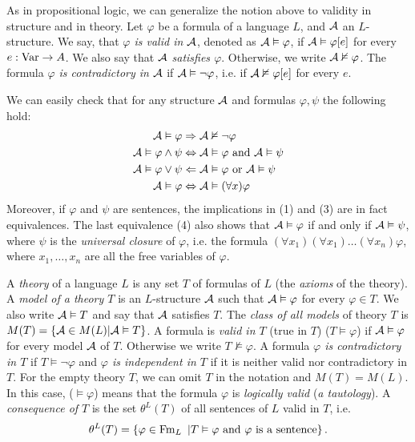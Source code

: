 As in propositional logic, we can generalize the notion above to validity in structure and in theory. Let $\varphi$ be a formula of a language $L$, and $\mathcal{A}$ an $L$-structure. We say, that \emph{$\varphi$ is valid in $\mathcal{A}$}, denoted as $\mathcal{A} \vDash \varphi$, if $\mathcal{A} \vDash \varphi[e]$ for every $e: \operatorname{Var} \to A$. We also say that \emph{$\mathcal{A}$ satisfies $\varphi$}. Otherwise, we write $\mathcal{A} \nvDash \varphi$. The formula \emph{$\varphi$ is contradictory in $\mathcal{A}$} if $\mathcal{A} \vDash \neg \varphi$, i.e. if $\mathcal{A} \nvDash \varphi[e]$ for every $e$.

We can easily check that for any structure $\mathcal{A}$ and formulas $\varphi, \psi$ the following hold:
\begin{align}
	\mathcal{A} \vDash \varphi & \Rightarrow \mathcal{A} \nvDash \neg \varphi \\
	\mathcal{A} \vDash \varphi \land \psi & \Leftrightarrow \mathcal{A} \vDash \varphi \text{ and } \mathcal{A} \vDash \psi\\
	\mathcal{A} \vDash \varphi \lor \psi & \Leftarrow \mathcal{A} \vDash \varphi \text{ or } \mathcal{A} \vDash \psi\\
	\mathcal{A} \vDash \varphi & \Leftrightarrow \mathcal{A} \vDash (\forall x)\varphi
\end{align}
Moreover, if $\varphi$ and $\psi$ are sentences, the implications in (1) and (3) are in fact equivalences. The last equivalence (4) also shows that $\mathcal{A} \vDash \varphi$ if and only if $\mathcal{A} \vDash \psi$, where $\psi$ is the \emph{universal closure} of $\varphi$, i.e. the formula $(\forall x_1)(\forall x_1) \dots (\forall x_n)\varphi$, where $x_1, \dots, x_n$ are all the free variables of $\varphi$.

A \emph{theory} of a language $L$ is any set $T$ of formulas of $L$ (the \emph{axioms} of the theory). A \emph{model of a theory $T$} is an $L$-structure $\mathcal{A}$ such that $\mathcal{A} \vDash \varphi$ for every $\varphi \in T$. We also write $\mathcal{A} \vDash T$ and say that $\mathcal{A}$ satisfies $T$. The \emph{class of all models} of theory $T$ is $M(T) = \{\mathcal{A} \in M(L) | \mathcal{A} \vDash T\}$. A formula is \emph{valid in $T$} (true in $T$) ($T\vDash \varphi$) if $\mathcal{A} \vDash \varphi$ for every model $\mathcal{A}$ of $T$. Otherwise we write $T \nvDash \varphi$. A formula \emph{$\varphi$ is contradictory in $T$} if $T \vDash \neg \varphi$ and \emph{$\varphi$ is independent in $T$} if it is neither valid nor contradictory in $T$. For the empty theory $T$, we can omit $T$ in the notation and $M(T)=M(L)$. In this case, ($\vDash \varphi$) means that the formula $\varphi$ is \emph{logically valid} (\emph{a tautology}). A \emph{consequence of $T$} is the set $\theta^L(T)$ of all sentences of $L$ valid in $T$, i.e. $$\theta^L(T) = \{\varphi \in \operatorname{Fm}_L\ | T\vDash \varphi \text{ and } \varphi \text{ is a sentence}\}\,.$$

